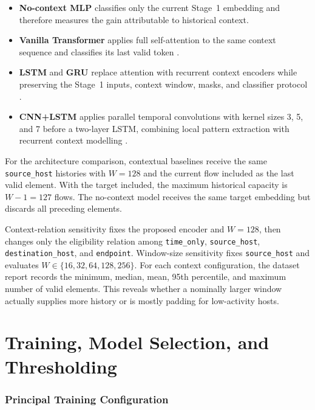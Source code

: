 \documentclass[11pt,fleqn]{report}
\begin{document}
\begin{itemize}[leftmargin=*]
    \item \textbf{No-context MLP} classifies only the current Stage~1
    embedding and therefore measures the gain attributable to historical
    context.

    \item \textbf{Vanilla Transformer} applies full self-attention to the same
    context sequence and classifies its last valid token
    \cite{Vaswani2017}.

    \item \textbf{LSTM} and \textbf{GRU} replace attention with recurrent
    context encoders while preserving the Stage~1 inputs, context window,
    masks, and classifier protocol \cite{Hochreiter1997LSTM,Cho2014GRU}.

    \item \textbf{CNN+LSTM} applies parallel temporal convolutions with kernel
    sizes 3, 5, and 7 before a two-layer LSTM, combining local pattern
    extraction with recurrent context modelling
    \cite{Kim2014CNN,Hochreiter1997LSTM}.
\end{itemize}

For the architecture comparison, contextual baselines receive the same
\texttt{source\_host} histories with $W=128$ and the current flow included as
the last valid element. With the target included, the maximum historical
capacity is $W-1=127$ flows. The no-context model receives the same target
embedding but discards all preceding elements.

Context-relation sensitivity fixes the proposed encoder and $W=128$, then
changes only the eligibility relation among \texttt{time\_only},
\texttt{source\_host}, \texttt{destination\_host}, and \texttt{endpoint}.
Window-size sensitivity fixes \texttt{source\_host} and evaluates
$W\in\{16,32,64,128,256\}$. For each context configuration, the dataset report
records the minimum, median, mean, 95th percentile, and maximum number of valid
elements. This reveals whether a nominally larger window actually supplies
more history or is mostly padding for low-activity hosts.

\section{Training, Model Selection, and Thresholding}
\label{subsec:experimental_training_protocol}

\subsubsection{Principal Training Configuration}
\label{subsubsec:principal_training_config}
\end{document}
